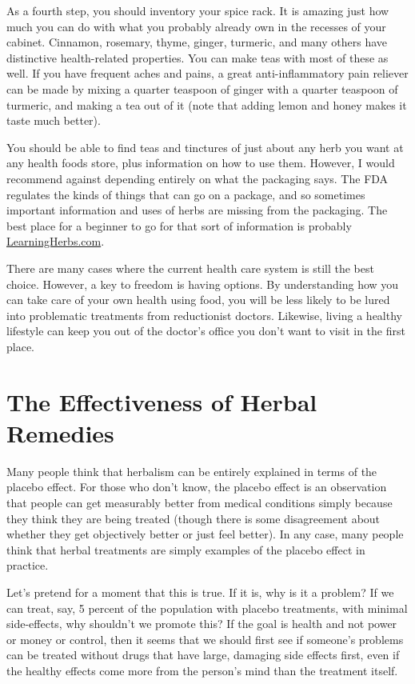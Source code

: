 As a fourth step, you should inventory your spice rack.
It is amazing just how much you can do with
what you probably already own in the recesses of your cabinet. Cinnamon, rosemary,
thyme, ginger, turmeric, and many others have distinctive
health-related properties. You can make teas with most of these as
well. If you have frequent aches and pains, a great anti-inflammatory
pain reliever can be made by mixing a quarter teaspoon of ginger with a
quarter teaspoon of turmeric, and making a tea out of it (note that adding lemon
and honey makes it taste much better).

You should be able to find teas and tinctures of just about any herb
you want at any health foods store, plus information on how to use them. However, I would
recommend against depending entirely on what the packaging says. The
FDA regulates the kinds of things that can go on a package, and so
sometimes important information and uses of herbs are missing from the
packaging. The best place for a beginner to go for that sort of
information is probably \url{LearningHerbs.com}.

There are many cases where the current health care system is still the
best choice. However, a key to freedom is having options. By
understanding how you can take care of your own health using food, you
will be less likely to be lured into problematic treatments from
reductionist doctors.  Likewise, living a healthy
lifestyle can keep you out of the doctor’s office you don’t want to
visit in the first place.

\section{The Effectiveness of Herbal Remedies}
Many people think that herbalism can be entirely explained in terms of
the placebo effect. For those who don't know, the
placebo effect is an observation that people can get measurably better
from medical conditions simply because they think they are being
treated (though there is some disagreement about whether they get
objectively better or just feel better). In any case, many people think
that herbal treatments are simply examples of the placebo effect in
practice. 

Let's pretend for a moment that this is true. If it is, why is it a problem?  
If we can treat, say, 5 percent of the population with placebo treatments,
with minimal side-effects, why shouldn't we promote
this?  If the goal is health and not power or money or control, then it
seems that we should first see if someone's problems
can be treated without drugs that have large,
damaging side effects first, even if the healthy effects come more from
the person's mind than the treatment itself.

